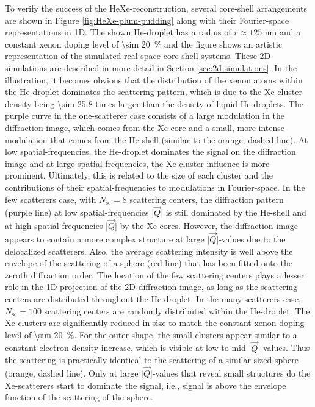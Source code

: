 To verify the success of the HeXe-reconstruction, several core-shell arrangements are shown in Figure \ref{fig:HeXe-plum-pudding} along with their Fourier-space representations in 1D. The shown He-droplet has a radius of $r\approx 125$ nm and a constant xenon doping level of \SI{\sim 20}{\percent} and the figure shows an artistic representation of the simulated real-space core shell systems. These 2D-simulations are described in more detail in Section \ref{sec:2d-simulations}. In the illustration, it becomes obvious that the distribution of the xenon atoms within the He-droplet dominates the scattering pattern, which is due to the Xe-cluster density being \num{\sim 25.8} times larger than the density of liquid He-droplets. The purple curve in the one-scatterer case consists of a large modulation in the diffraction image, which comes from the Xe-core and a small, more intense modulation that comes from the He-shell (similar to the orange, dashed line). At low spatial-frequencies, the He-droplet dominates the signal on the diffraction image and at large spatial-frequencies, the Xe-cluster influence is more prominent. Ultimately, this is related to the size of each cluster and the contributions of their spatial-frequencies to modulations in Fourier-space. In the few scatterers case, with $N_{\text{sc}}=8$ scattering centers, the diffraction pattern (purple line) at low spatial-frequencies $\lvert\vec{Q}\rvert$ is still dominated by the He-shell and at high spatial-frequencies $\lvert\vec{Q}\rvert$ by the Xe-cores. However, the diffraction image appears to contain a more complex structure at large $\lvert\vec{Q}\rvert$-values due to the delocalized scatterers. Also, the average scattering intensity is well above the envelope of the scattering of a sphere (red line) that has been fitted onto the zeroth diffraction order. The location of the few scattering centers plays a lesser role in the 1D projection of the 2D diffraction image, as long as the scattering centers are distributed throughout the He-droplet. In the many scatterers case, $N_{\text{sc}}=100$ scattering centers are randomly distributed within the He-droplet. The Xe-clusters are significantly reduced in size to match the constant xenon doping level of \SI{\sim 20}{\percent}. For the outer shape, the small clusters appear similar to a constant electron density increase, which is visible at low-to-mid $\lvert\vec{Q}\rvert$-values. Thus the scattering is practically identical to the scattering of a similar sized sphere (orange, dashed line). Only at large $\lvert\vec{Q}\rvert$-values that reveal small structures do the Xe-scatterers start to dominate the signal, i.e., signal is above the envelope function of the scattering of the sphere.\\[1\baselineskip]
